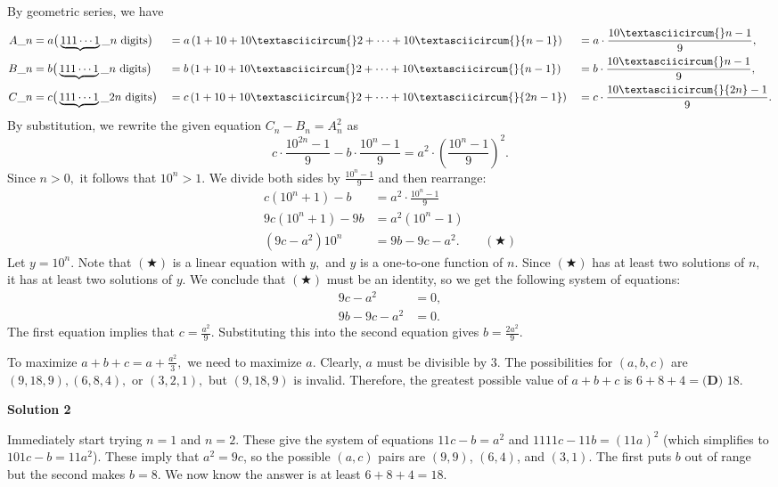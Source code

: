 \begin{enumerate}
By geometric series, we have
 \begin{alignat*}{8} A\_n&=a\bigl(\phantom{ }\underbrace{111\cdots1}\_{n\text{ digits}}\phantom{ }\bigr)&&=a\left(1+10+10\textasciicircum{}2+\cdots+10\textasciicircum{}{n-1}\right)&&=a\cdot\frac{10\textasciicircum{}n-1}{9}, \\ B\_n&=b\bigl(\phantom{ }\underbrace{111\cdots1}\_{n\text{ digits}}\phantom{ }\bigr)&&=b\left(1+10+10\textasciicircum{}2+\cdots+10\textasciicircum{}{n-1}\right)&&=b\cdot\frac{10\textasciicircum{}n-1}{9}, \\ C\_n&=c\bigl(\phantom{ }\underbrace{111\cdots1}\_{2n\text{ digits}}\phantom{ }\bigr)&&=c\left(1+10+10\textasciicircum{}2+\cdots+10\textasciicircum{}{2n-1}\right)&&=c\cdot\frac{10\textasciicircum{}{2n}-1}{9}. \end{alignat*}By substitution, we rewrite the given equation $C_n - B_n = A_n^2$ as
 \[c\cdot\frac{10^{2n}-1}{9} - b\cdot\frac{10^n-1}{9} = a^2\cdot\left(\frac{10^n-1}{9}\right)^2.\]Since $n > 0,$ it follows that $10^n > 1.$ We divide both sides by $\frac{10^n-1}{9}$ and then rearrange:
 \begin{align*} c\left(10^n+1\right) - b &= a^2\cdot\frac{10^n-1}{9} \\ 9c\left(10^n+1\right) - 9b &= a^2\left(10^n-1\right) \\ \left(9c-a^2\right)10^n &= 9b-9c-a^2. &&(\bigstar) \end{align*}
Let $y=10^n.$ Note that $(\bigstar)$ is a linear equation with $y,$ and $y$ is a one-to-one function of $n.$ Since $(\bigstar)$ has at least two solutions of $n,$ it has at least two solutions of $y.$ We conclude that $(\bigstar)$ must be an identity, so we get the following system of equations:
 \begin{align*} 9c-a^2&=0, \\ 9b-9c-a^2&=0. \end{align*}
The first equation implies that $c=\frac{a^2}{9}.$ Substituting this into the second equation gives $b=\frac{2a^2}{9}.$ 

 To maximize $a + b + c = a + \frac{a^2}{3},$ we need to maximize $a.$ Clearly, $a$ must be divisible by $3.$ The possibilities for $(a,b,c)$ are $(9,18,9),(6,8,4),$ or $(3,2,1),$ but $(9,18,9)$ is invalid. Therefore, the greatest possible value of $a + b + c$ is $6+8+4=\boxed{\textbf{(D) } 18}.$




\textbf{Solution 2}

Immediately start trying $n = 1$ and $n = 2$. These give the system of equations $11c - b = a^2$ and $1111c - 11b = (11a)^2$ (which simplifies to $101c - b = 11a^2$). These imply that $a^2 = 9c$, so the possible $(a, c)$ pairs are $(9, 9)$, $(6, 4)$, and $(3, 1)$. The first puts $b$ out of range but the second makes $b = 8$. We now know the answer is at least $6 + 8 + 4 = 18$.


\end{enumerate}
